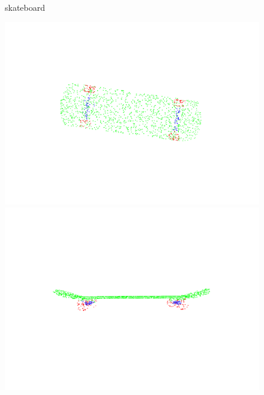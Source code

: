 \begin{figure}[htbp]
    \begin{minipage}{0.1\textwidth}
        \centering
        {skateboard}
    \end{minipage}
    \hfill
    \begin{minipage}{0.25\textwidth}
        \centering
        \includegraphics[width=\textwidth]{fig/supplement/part_segmentation/skateboard/skateboard00.pdf}
    \end{minipage}
    \hfill
    \begin{minipage}{0.25\textwidth}
        \centering
        \includegraphics[width=\textwidth]{fig/supplement/part_segmentation/skateboard/skateboard01.pdf}
    \end{minipage}
    \hfill
    \begin{minipage}{0.25\textwidth}

\end{minipage}
\end{figure}
